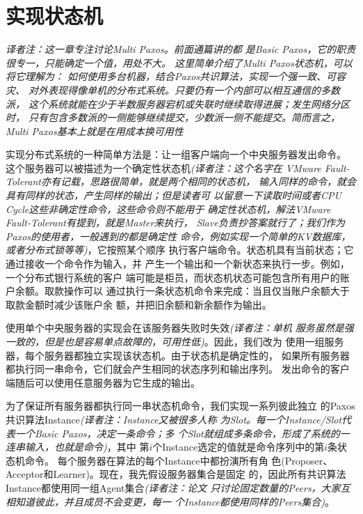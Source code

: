\section{实现状态机}
\emph{译者注：这一章专注讨论Multi Paxos。前面通篇讲的都
是Basic Paxos，它的职责很专一，只能确定一个值，用处不大。
这里简单介绍了Multi Paxos状态机，可以将它理解为：
如何使用多台机器，结合Paxos共识算法，实现一个强一致、可容灾、
对外表现得像单机的分布式系统。只要仍有一个内部可以相互通信的多数派，
这个系统就能在少于半数服务器宕机或失联时继续取得进展；发生网络分区时，
只有包含多数派的一侧能够继续提交，少数派一侧不能提交。简而言之，
Multi Paxos基本上就是在用成本换可用性}

实现分布式系统的一种简单方法是：让一组客户端向一个中央服务器发出命令。
这个服务器可以被描述为一个确定性状态机\emph{(译者注：这个名字在
VMware Fault-Tolerant亦有记载，思路很简单，就是两个相同的状态机，
输入同样的命令，就会具有同样的状态，产生同样的输出；但是读者可
以留意一下读取时间或者CPU Cycle这些非确定性命令，这些命令则不能用于
确定性状态机，解法VMware Fault-Tolerant有提到，就是Master来执行，
Slave负责抄答案就行了；我们作为Paxos的使用者，一般遇到的都是确定性
命令，例如实现一个简单的KV数据库，或者分布式锁等等)}，它按照某个顺序
执行客户端命令。状态机具有当前状态；它通过接收一个命令作为输入，并
产生一个输出和一个新状态来执行一步。例如，一个分布式银行系统的客户
端可能是柜员，而状态机状态可能包含所有用户的账户余额。取款操作可以
通过执行一条状态机命令来完成：当且仅当账户余额大于取款金额时减少该账户余
额，并把旧余额和新余额作为输出。

使用单个中央服务器的实现会在该服务器失败时失效\emph{(译者注：单机
服务虽然是强一致的，但是也是容易单点故障的，可用性低)}。因此，我们改为
使用一组服务器，每个服务器都独立实现该状态机。由于状态机是确定性的，
如果所有服务器都执行同一串命令，它们就会产生相同的状态序列和输出序列。
发出命令的客户端随后可以使用任意服务器为它生成的输出。

为了保证所有服务器都执行同一串状态机命令，我们实现一系列彼此独立
的Paxos共识算法Instance\emph{(译者注：Instance又被很多人称
为Slot。每一个Instance/Slot代表一个Basic Paxos，决定一条命令；多
个Slot就组成多条命令，形成了系统的一连串输入，也就是命令)}，其中
第\(i\)个Instance选定的值就是命令序列中的第\(i\)条状态机命令。
每个服务器在算法的每个Instance中都扮演所有角
色(Proposer、Acceptor和Learner)。现在，我先假设服务器集合是固定
的，因此所有共识算法Instance都使用同一组Agent集合\emph{(译者注：论文
只讨论固定数量的Peers，大家互相知道彼此，并且成员不会变更，每一
个Instance都使用同样的Peers集合)}。

